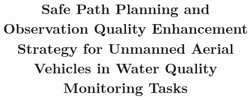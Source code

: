 \documentclass[final,3p,times,numbers]{elsarticle}
\begin{document}
\begin{frontmatter}



\title{Safe Path Planning and Observation Quality Enhancement Strategy for Unmanned Aerial Vehicles in Water Quality Monitoring Tasks} %





\end{frontmatter}
\end{document}
